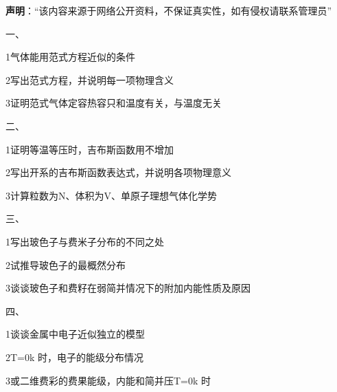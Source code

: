 
\textbf{声明}：“该内容来源于网络公开资料，不保证真实性，如有侵权请联系管理员”



一、

{1}气体能用范式方程近似的条件

{2}写出范式方程，并说明每一项物理含义

{3}证明范式气体定容热容只和温度有关，与温度无关


二、

{1}证明等温等压时，吉布斯函数用不增加

{2}写出开系的吉布斯函数表达式，并说明各项物理意义

{3}计算粒数为N、体积为V、单原子理想气体化学势

三、

{1}写出玻色子与费米子分布的不同之处

{2}试推导玻色子的最概然分布

{3}谈谈玻色子和费籽在弱简并情况下的附加内能性质及原因

四、

{1}谈谈金属中电子近似独立的模型

{2}T=0k 时，电子的能级分布情况

{3}或二维费彩的费果能级，内能和简并压{T=0k 时}